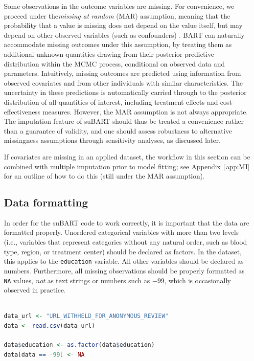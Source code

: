\documentclass[aoas,preprint]{imsart}
\theoremstyle{plain}
\theoremstyle{definition}
\theoremstyle{remark}
\theoremstyle{remark}
\begin{document}
Some observations in the outcome variables are missing. For convenience, we proceed under the\emph{missing at random} (MAR) assumption, meaning that the probability that a value is missing does not depend on the value itself, but may depend on other observed variables (such as confounders) \citep{harel2007multiple}. BART can naturally accommodate missing outcomes under this assumption, by treating them as additional unknown quantities drawing from their posterior predictive distribution within the MCMC process, conditional on observed data and parameters. 
Intuitively, missing outcomes are predicted using information from observed covariates and from other individuals with similar characteristics. The uncertainty in these predictions is automatically carried through to the posterior distribution of all quantities of interest, including treatment effects and cost-effectiveness measures.
However, the MAR assumption is not always appropriate. The imputation feature of suBART should thus be treated a convenience rather than a guarantee of validity, and one should assess robustness to alternative missingness assumptions through sensitivity analyses, as discussed later.

If covariates are missing in an applied dataset, the workflow in this section can be combined with multiple imputation prior to model fitting; see Appendix~\ref{app:MI} for an outline of how to do this (still under the MAR assumption).

\subsection{Data formatting}
In order for the suBART code to work correctly, it is important that the data are formatted properly.
Unordered categorical variables with more than two levels (i.e., variables that represent categories without any natural order, such as blood type, region, or treatment center) should be declared as factors. In the dataset, this applies to the \texttt{education} variable. All other variables should be declared as numbers. 
Furthermore, all missing observations should be properly formatted as \texttt{NA} values, \emph{not} as text strings or numbers such as $-99$, which is occasionally observed in practice.

\begin{lstlisting}[language=R, caption={Loading the data, handling the unordered categorical variables and handle missing data in the outcomes, respectively.}]

data_url <- "URL_WITHHELD_FOR_ANONYMOUS_REVIEW"
data <- read.csv(data_url)

data$education <- as.factor(data$education)
data[data == -99] <- NA
\end{lstlisting}
\end{document}
